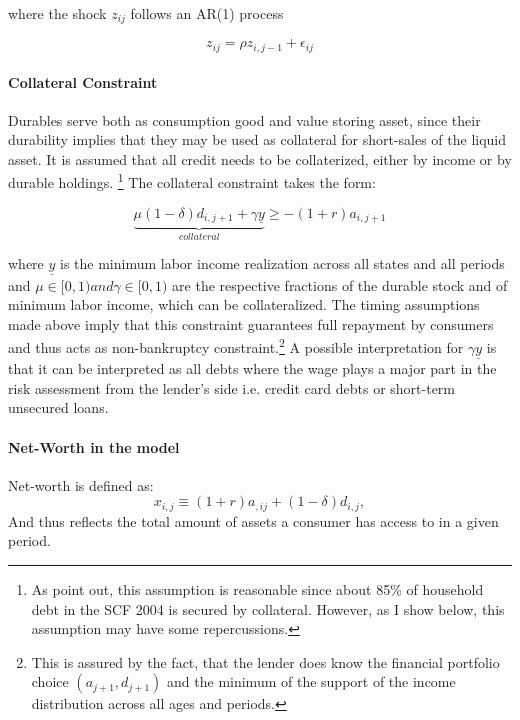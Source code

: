 \documentclass[a4paper,12pt,legno]{article}
\begin{document}
where the shock $z_{ij}$ follows an AR(1) process

\begin{equation}\label{eq:ar1_shock}
z_{ij} = \rho z_{i,j-1}+\epsilon_{ij}
\end{equation}


\paragraph{Collateral Constraint}
Durables serve both as consumption good and value storing asset, since their durability implies that they may be used as collateral for short-sales of the liquid asset. It is assumed that all credit needs to be collaterized, either by income or by durable holdings. \footnote{As \citep{hintermaier2010} point out, this assumption is reasonable since about 85\% of household debt in the SCF 2004 is secured by collateral. However, as I show below, this assumption may have some repercussions.} The collateral constraint takes the form:

\begin{equation}\label{eq:borrowing_constraint}
\underbrace{\mu(1-\delta)d_{i,j+1} + \gamma\underline{y}}_{collateral} \geq -(1+r)a_{i,j+1}
\end{equation}

where $\underline{y}$ is the minimum labor income realization across all states and all periods and $\mu \in [0,1) and \gamma \in [0,1)$ are the respective fractions of the durable stock and of minimum labor income, which can be collateralized. The timing assumptions made above imply that this constraint guarantees full repayment by consumers and thus acts as non-bankruptcy constraint.\footnote{This is assured by the fact, that the lender does know the financial portfolio choice $(a_{j+1},d_{j+1})$ and the minimum of the support of the income distribution across all ages and periods.} A possible interpretation for $\gamma\underline{y}$ is that it can be interpreted as all debts where the wage plays a major part in the risk assessment from the lender's side i.e. credit card debts or short-term unsecured loans. 


\paragraph{Net-Worth in the model} 
Net-worth is defined as:
\begin{equation}\label{eq:net_worth}
x_{i,j} \equiv (1+r)a_{,ij} + (1-\delta)d_{i,j},
\end{equation}
And thus reflects the total amount of assets a consumer has access to in a given period.
\end{document}
